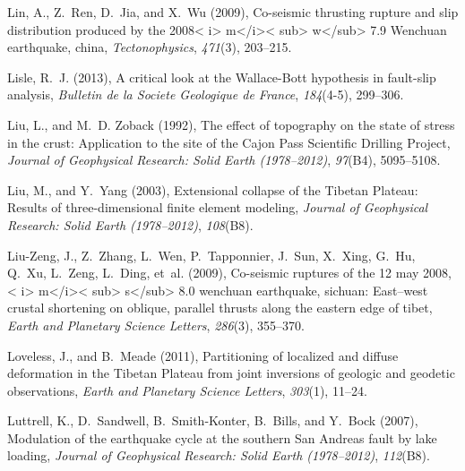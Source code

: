 \documentclass[twocolumn,jgrga]{AGUTeX}
\begin{document}
\begin{article}
{{\begin{thebibliography}{85}
Lin, A., Z.~Ren, D.~Jia, and X.~Wu (2009), Co-seismic thrusting rupture and
  slip distribution produced by the 2008< i> m</i>< sub> w</sub> 7.9 {W}enchuan
  earthquake, china, \textit{Tectonophysics}, \textit{471}(3), 203--215.

Lisle, R.~J. (2013), A critical look at the {W}allace-{B}ott hypothesis in
  fault-slip analysis, \textit{Bulletin de la Societe Geologique de France},
  \textit{184}(4-5), 299--306.

Liu, L., and M.~D. Zoback (1992), The effect of topography on the state of
  stress in the crust: {A}pplication to the site of the {C}ajon {P}ass
  {S}cientific {D}rilling {P}roject, \textit{Journal of Geophysical Research:
  Solid Earth (1978--2012)}, \textit{97}(B4), 5095--5108.

Liu, M., and Y.~Yang (2003), Extensional collapse of the {T}ibetan {P}lateau:
  {R}esults of three-dimensional finite element modeling, \textit{Journal of
  Geophysical Research: Solid Earth (1978--2012)}, \textit{108}(B8).

Liu-Zeng, J., Z.~Zhang, L.~Wen, P.~Tapponnier, J.~Sun, X.~Xing, G.~Hu, Q.~Xu,
  L.~Zeng, L.~Ding, et~al. (2009), Co-seismic ruptures of the 12 may 2008,< i>
  m</i>< sub> s</sub> 8.0 wenchuan earthquake, sichuan: East--west crustal
  shortening on oblique, parallel thrusts along the eastern edge of tibet,
  \textit{Earth and Planetary Science Letters}, \textit{286}(3), 355--370.

Loveless, J., and B.~Meade (2011), Partitioning of localized and diffuse
  deformation in the {T}ibetan {P}lateau from joint inversions of geologic and
  geodetic observations, \textit{Earth and Planetary Science Letters},
  \textit{303}(1), 11--24.

Luttrell, K., D.~Sandwell, B.~Smith-Konter, B.~Bills, and Y.~Bock (2007),
  Modulation of the earthquake cycle at the southern {S}an {A}ndreas fault by
  lake loading, \textit{Journal of Geophysical Research: Solid Earth
  (1978--2012)}, \textit{112}(B8).


\end{thebibliography}}}
\end{article}
\end{document}
